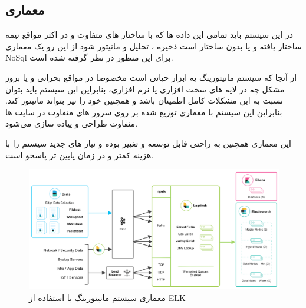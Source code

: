 \documentclass{llncs}
\begin{document}
\newpage

\subsection{معماری}

در این سیستم باید تمامی این داده ها که با ساختار های متفاوت و در اکثر مواقع نیمه ساختار یافته و یا بدون ساختار است ذخیره ، تحلیل و مانیتور شود از این رو یک معماری NoSql برای این منظور در نظر گرفته شده است.

از آنجا که سیستم مانیتورینگ یه ابزار حیاتی است مخصوصا در مواقع بحرانی و یا بروز مشکل چه در لایه های سخت افزاری یا نرم افزاری، بنابراین این سیستم باید بتوان نسبت به این مشکلات کامل اطمینان باشد و همچنین خود را نیز بتواند مانیتور کند.
بنابراین این سیستم با معماری توزیع شده بر روی سرور های متفاوت در سایت ها متفاوت طراحی و پیاده سازی می‌شود.

این معماری همچنین به راحتی قابل توسعه و تغییر بوده و نیاز های جدید سیستم را با هزینه کمتر و در زمان پایین تر پاسخو است.

\begin{figure}
\centering
\includegraphics[width=1\textwidth]{mahi/bi-5.png}
\centering
\caption{معماری سیستم مانیتورینگ با استفاده از ELK}
\label{fig:ReportedVariables}
\end{figure}
\end{document}

